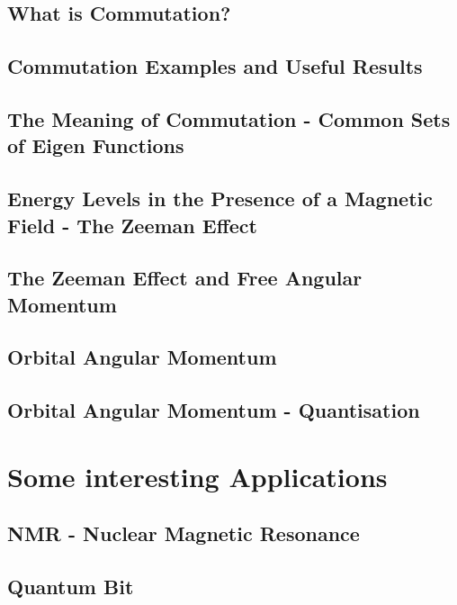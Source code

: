 \documentclass[colorlinks,11pt,a4paper,normalphoto,withhyper,ragged2e]{altareport}
\begin{document}
	
	\subsection{What is Commutation?}
	
	
	\subsection{Commutation Examples and Useful Results}
	
	
	\subsection{The Meaning of Commutation - Common Sets of Eigen Functions}
	
	
	\subsection{Energy Levels in the Presence of a Magnetic Field - The Zeeman Effect}
	
	
	\subsection{The Zeeman Effect and Free Angular Momentum}
	
	
	\subsection{Orbital Angular Momentum}
	
	
	\subsection{Orbital Angular Momentum - Quantisation}
	
	
	\pagebreak
	

\section{Some interesting Applications}
	
	\subsection{NMR - Nuclear Magnetic Resonance}
	
	\subsection{Quantum Bit}
		
\end{document}
